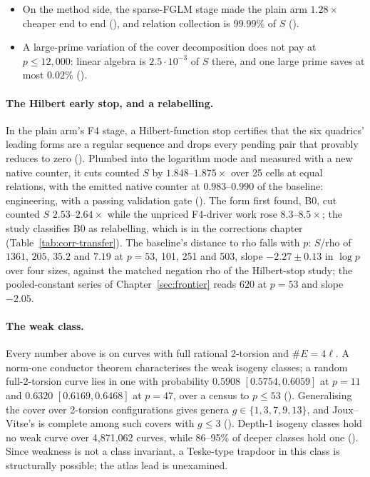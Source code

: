 \begin{itemize}
  (
  \S11) with no erratum; it should be read through the review. Leaderboard
  Table~D, the historical study, is withheld.
\item On the method side, the sparse-FGLM stage made the plain arm
  $1.28\times$ cheaper end to end
  (), and relation collection is
  $99.99\%$ of $S$ ().
\item A large-prime variation of the cover decomposition does not pay at
  $p\le12{,}000$: linear algebra is $2.5\cdot10^{-3}$ of $S$ there, and one large
  prime saves at most $0.02\%$ ().
\end{itemize}

\paragraph{The Hilbert early stop, and a relabelling.} In the plain arm's
F4 stage, a Hilbert-function stop certifies that the six quadrics' leading
forms are a regular sequence and drops every pending pair that provably
reduces to zero ().
Plumbed into the logarithm mode and measured with a new native counter, it
cuts counted $S$ by $1.848$--$1.875\times$ over 25 cells at equal relations,
with the emitted native counter at $0.983$--$0.990$ of the baseline:
engineering, with a passing validation gate
(). The form first found,
B0, cut counted $S$ $2.53$--$2.64\times$ while the unpriced F4-driver work rose
$8.3$--$8.5\times$; the study classifies B0 as relabelling, which is in the
corrections chapter (Table~\ref{tab:corr-transfer}). The baseline's distance
to rho falls with $p$: $S$/rho of $1361$, $205$, $35.2$ and $7.19$ at $p=53$,
101, 251 and 503, slope $-2.27\pm0.13$ in $\log p$ over four sizes, against
the matched negation rho of the Hilbert-stop study; the pooled-constant
series of Chapter~\ref{sec:frontier} reads $620$ at $p=53$ and slope $-2.05$.

\paragraph{The weak class.} Every number above is on curves with full
rational 2-torsion and $\#E=4\ell$. A norm-one conductor theorem
characterises the weak isogeny classes; a random full-2-torsion curve lies
in one with probability $0.5908$ $[0.5754,0.6059]$ at $p=11$ and $0.6320$
$[0.6169,0.6468]$ at $p=47$, over a census to $p\le53$
(). Generalising the cover
over 2-torsion configurations gives genera $g\in\{1,3,7,9,13\}$, and
Joux--Vitse's is complete among such covers with $g\le3$
(). Depth-1 isogeny
classes hold no weak curve over 4{,}871{,}062 curves, while 86--95\% of deeper
classes hold one (). Since weakness is not a
class invariant, a Teske-type trapdoor in this class is structurally
possible; the atlas lead is unexamined.


